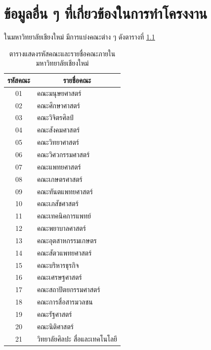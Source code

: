 \chapter{ข้อมูลอื่น ๆ ที่เกี่ยวข้องในการทำโครงงาน}
\newcommand\str[1]{\texttt{#1}}
ในมหาวิทยาลัยเชียงใหม่ มีการแบ่งคณะต่าง ๆ ดังตารางที่ \ref{tab:faculty_code}

\begin{table}[h]
  \centering
  \begin{tabular}{@{}cl@{}}
  \toprule
  \multicolumn{1}{c}{\textbf{รหัสคณะ}} & \multicolumn{1}{c}{\textbf{รายชื่อคณะ}}                 \\ \midrule
  01      & คณะมนุษยศาสตร์                 \\
  02      & คณะศึกษาศาสตร์                 \\
  03      & คณะวิจิตรศิลป์                 \\
  04      & คณะสังคมศาสตร์                 \\
  05      & คณะวิทยาศาสตร์                 \\
  06      & คณะวิศวกรรมศาสตร์              \\
  07      & คณะแพทยศาสตร์                  \\
  08      & คณะเกษตรศาสตร์                 \\
  09      & คณะทันตแพทยศาสตร์              \\
  10      & คณะเภสัชศาสตร์                 \\
  11      & คณะเทคนิคการแพทย์              \\
  12      & คณะพยาบาลศาสตร์                \\
  13      & คณะอุตสาหกรรมเกษตร             \\
  14      & คณะสัตวแพทยศาสตร์              \\
  15      & คณะบริหารธุรกิจ                \\
  16      & คณะเศรษฐศาสตร์                 \\
  17      & คณะสถาปัตยกรรมศาสตร์           \\
  18      & คณะการสื่อสารมวลชน             \\
  19      & คณะรัฐศาสตร์                   \\
  20      & คณะนิติศาสตร์                  \\
  21      & วิทยาลัยศิลปะ สื่อและเทคโนโลยี
  \end{tabular}
  \caption{ตารางแสดงรหัสคณะและรายชื่อคณะภายในมหาวิทยาลัยเชียงใหม่}
  \label{tab:faculty_code}
\end{table}

